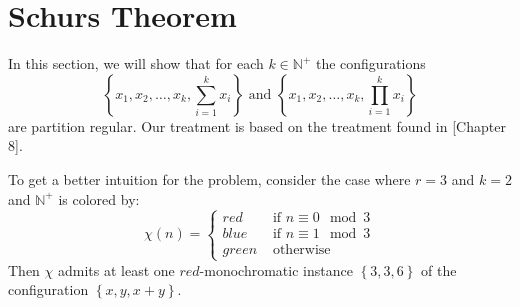 \section{Schurs Theorem}
In this section, we will show that for each $k \in \mathbb{N}^{+}$ the configurations
\begin{equation*}
\left\{x_1, x_2, \ldots, x_{k}, \sum_{i = 1}^k x_i\right\} \text{ and }  \left\{x_1, x_2, \ldots, x_{k}, \prod_{i = 1}^k x_i\right\}
\end{equation*}
are partition regular. Our treatment is based on the treatment found in \cite{rtoi}[Chapter 8].

\begin{example}\label{exmp:schur}
	To get a better intuition for the problem, consider the case where $r = 3$ and $k = 2$ and $\mathbb{N}^+$ is colored by:
	\begin{equation*}
		\chi(n) = \begin{cases} red   & \text{ if } n \equiv 0 \mod 3  \\
              blue  & \text{ if }  n \equiv 1 \mod 3 \\
              green & \text{ otherwise }
		\end{cases}
	\end{equation*}
	Then $\chi$ admits at least one $red$-monochromatic instance $\left\{3, 3, 6\right\}$ of the configuration $\left\{x, y, x + y\right\}$.
\end{example}

